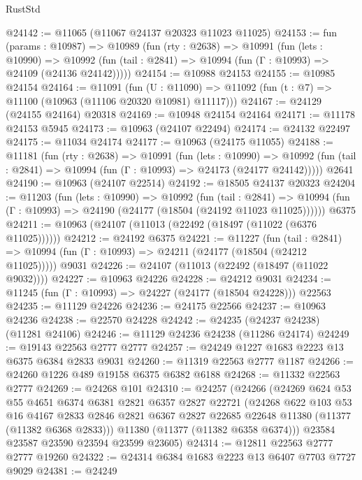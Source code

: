 \begin{lexlean}{RustStd}
\begin{coremodule}
@24142 := @11065 (@11067 @24137 @20323 @11023 @11025)
@24153 := fun (params : @10987) =>
  @10989
    (fun (rty : @2638) =>
    @10991
      (fun (lets : @10990) =>
      @10992 (fun (tail : @2841) => @10994 (fun (Γ : @10993) => @24109 (@24136 @24142)))))
@24154 := @10988 @24153
@24155 := @10985 @24154
@24164 := @11091
    (fun (U : @11090) => @11092 (fun (t : @7) => @11100 (@10963 (@11106 @20320 @10981) @11117)))
@24167 := @24129 (@24155 @24164) @20318
@24169 := @10948 @24154 @24164
@24171 := @11178 @24153 @5945
@24173 := @10963 (@24107 @22494)
@24174 := @24132 @22497
@24175 := @11034 @24174
@24177 := @10963 (@24175 @11055)
@24188 := @11181
    (fun (rty : @2638) =>
    @10991
      (fun (lets : @10990) =>
      @10992 (fun (tail : @2841) => @10994 (fun (Γ : @10993) => @24173 (@24177 @24142)))))
    @2641
@24190 := @10963 (@24107 @22514)
@24192 := @18505 @24137 @20323
@24204 := @11203
    (fun (lets : @10990) =>
    @10992
      (fun (tail : @2841) =>
      @10994 (fun (Γ : @10993) => @24190 (@24177 (@18504 (@24192 @11023 @11025))))))
    @6375
@24211 := @10963 (@24107 (@11013 (@22492 (@18497 (@11022 (@6376 @11025))))))
@24212 := @24192 @6375
@24221 := @11227
    (fun (tail : @2841) => @10994 (fun (Γ : @10993) => @24211 (@24177 (@18504 (@24212 @11025)))))
    @9031
@24226 := @24107 (@11013 (@22492 (@18497 (@11022 @9032))))
@24227 := @10963 @24226
@24228 := @24212 @9031
@24234 := @11245 (fun (Γ : @10993) => @24227 (@24177 (@18504 @24228))) @22563
@24235 := @11129 @24226
@24236 := @24175 @22566
@24237 := @10963 @24236
@24238 := @22570 @24228
@24242 := @24235 (@24237 @24238) (@11281 @24106)
@24246 := @11129 @24236 @24238 (@11286 @24174)
@24249 := @19143 @22563 @2777 @2777
@24257 := @24249 @1227 @1683 @2223 @13 @6375 @6384 @2833 @9031
@24260 := @11319 @22563 @2777 @1187
@24266 := @24260 @1226 @489 @19158 @6375 @6382 @6188
@24268 := @11332 @22563 @2777
@24269 := @24268 @101
@24310 := @24257
    (@24266
      (@24269
        @624
        @53
        @55
        @4651
        @6374
        @6381
        @2821
        @6357
        @2827
        @22721
        (@24268
          @622
          @103
          @53
          @16
          @4167
          @2833
          @2846
          @2821
          @6367
          @2827
          @22685
          @22648
          @11380
          (@11377 (@11382 @6368 @2833)))
        @11380
        (@11377 (@11382 @6358 @6374)))
      @23584
      @23587
      @23590
      @23594
      @23599
      @23605)
@24314 := @12811 @22563 @2777 @2777 @19260
@24322 := @24314 @6384 @1683 @2223 @13 @6407 @7703 @7727 @9029
@24381 := @24249

\end{coremodule}
\end{lexlean}
